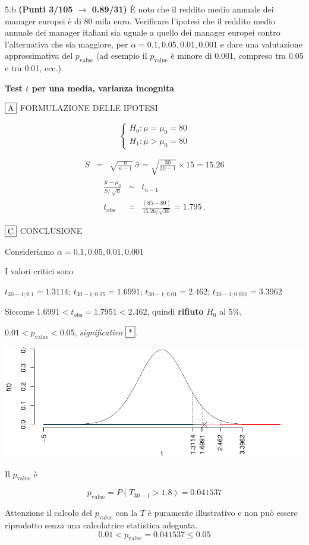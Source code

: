 \documentclass[
  11pt,
]{book}
\theoremstyle{mytheoremstyle}
\theoremstyle{mydefstyle}
\newenvironment{sol}
  {
  \begin{tcolorbox}[enhanced,breakable,arc=0.1mm,boxrule=1pt,colback=white,colframe=iblue,
  title=\bf \fontfamily{lmss}\selectfont \hspace{.5 cm} Soluzione,drop fuzzy shadow]

}{
\end{tcolorbox}
  }
\begin{document}
5.b \textbf{(Punti 3/105 \(\rightarrow\) 0.89/31)} È noto che il reddito medio annuale dei manager europei
è di 80 mila euro.
Verificare l'ipotesi
che il reddito medio annuale dei manager italiani sia uguale a quello
dei manager europei contro l'alternativa che sia maggiore, per \(\alpha=0.1,0.05,0.01,0.001\) e dare una valutazione approssimativa del \(p_\text{value}\) (ad esempio il \(p_\text{value}\) è minore di 0.001, compreso tra 0.05 e tra 0.01, ecc.).

\begin{sol}
\textbf{Test \(t\) per una media, varianza incognita}

\(\fbox{A}\) FORMULAZIONE DELLE IPOTESI

\[\begin{cases}
   H_0: \mu = \mu_0=80 \\
   H_1: \mu > \mu_0=80 
   \end{cases}\]

\begin{eqnarray*}
   S    &=& \sqrt{\frac{n} {n-1}}\ \widehat{\sigma} 
   =  \sqrt{\frac{ 30 } { 30 -1}} \times  15  =  15.26 
   \end{eqnarray*}
\begin{eqnarray*}
   \frac{\hat\mu - \mu_{0}} {S/\,\sqrt{n}}&\sim&t_{n-1}\\
   t_{\text{obs}}
   &=& \frac{ ( 85 -  80 )} { 15.26 /\sqrt{ 30 }}
   =   1.795 \, .
   \end{eqnarray*}

\(\fbox{C}\) CONCLUSIONE

Consideriamo \(\alpha=0.1, 0.05, 0.01, 0.001\)

I valori critici sono

\(t_{30-1;0.1}=1.3114\); \(t_{30-1;0.05}=1.6991\); \(t_{30-1;0.01}=2.462\); \(t_{30-1;0.001}=3.3962\)

Siccome \(1.6991<t_\text{obs}=1.7951<2.462\), quindi \textbf{rifiuto} \(H_0\) al 5\%,

\(0.01<p_\text{value}<0.05\), \emph{significativo} \(\fbox{*}\).

\begin{center}\includegraphics{Esami_passati_con_soluzioni_files/figure-latex/2024-27,-1} \end{center}

Il \(p_{\text{value}}\) è

\[ p_{\text{value}} = P(T_{30-1}>1.8)=0.041537 \]

Attenzione il calcolo del \(p_\text{value}\) con la \(T\) è puramente illustrativo e non può essere riprodotto senza una calcolatrice statistica adeguata.\[
 0.01 < p_\text{value}= 0.041537 \leq 0.05 
\]

\end{sol}
\end{document}
